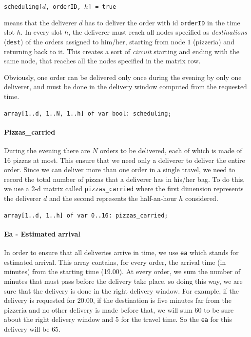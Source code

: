 \documentclass[10pt]{article}
\begin{document}
	\begin{center}
		\texttt{scheduling[$d$, orderID, $h$] = true}
	\end{center}
	
	means that the deliverer $d$ has to deliver the order with id 
	\texttt{orderID} in the time slot $h$. In every slot $h$, the deliverer must 
	reach all nodes specified as \textit{destinations} (\texttt{dest}) of the orders assigned to 
	him/her, starting from node $1$ (pizzeria) and returning back to it. This creates
	 a sort of \textit{circuit} starting and ending with the same node, that reaches all the 
	nodes specified in the matrix row.

	Obviously, one order can be delivered only once during the evening by only
	one deliverer, and must be done in the delivery window computed from the requested time.

	\begin{center}
		\texttt{array[1..d, 1..N, 1..h] of var bool: scheduling;}
	\end{center}

	\paragraph*{Pizzas\_carried}
	During the evening there are $N$ orders to be delivered, each of which is made of
	16 pizzas at most. This ensure that we need only a deliverer to deliver the 
	entire order.
	Since we can deliver more than one order in a single travel, we need to
	record the total number of pizzas that a deliverer has in his/her bag.
	To do this, we use a 2-d matrix called \texttt{pizzas\_carried} where
	the first dimension represents the deliverer $d$ and the second 
	represents the half-an-hour $h$ considered.


	\begin{center}
		\texttt{array[1..d, 1..h] of var 0..16: pizzas\_carried;}
	\end{center}

	\paragraph*{Ea - Estimated arrival}
	In order to ensure that all deliveries arrive in time, we use \texttt{ea} which
	stands for estimated arrival. This array contains, for every order, the arrival 
	time (in minutes) from the starting time (19.00). At every order, we sum the number 
	of minutes that must pass before the delivery take place, so doing this way,
	we are sure that the delivery is done in the right delivery window.
	For example, if the delivery is requested for 20.00, if the destination is five minutes 
	far from the pizzeria and no other delivery is made before that, we will sum 60 to 
	be sure about the right delivery window and 5 for the travel time. So the \texttt{ea}
	for this delivery will be 65.
	
\end{document}
